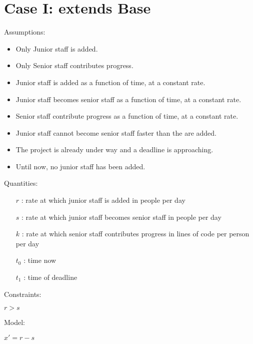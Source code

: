 \documentclass{article}
\newenvironment{atomize}
    {\begin{list} {} {
            \setlength\itemindent{0pt}
            \setlength\leftmargin{10pt}
            \setlength\labelwidth{0pt}
    }}
    {\end{list}}
\begin{document}
\section*{Case I: extends Base}
    \begin{atomize}
        \item Assumptions:
            \begin{itemize}
                \item Only Junior staff is added.
                \item Only Senior staff contributes progress.
								\item Junior staff is added as a function of time, at a constant
								rate.
								\item Junior staff becomes senior staff as a function of time,
								at a constant rate.
								\item Senior staff contribute progress as a function of time, at
								a constant rate.
                \item Junior staff cannot become senior staff faster than the
								are added.
								\item The project is already under way and a deadline is
								approaching.
								\item Until now, no junior staff has been added.
            \end{itemize}
        \item Quantities:
            \begin{itemize}
                \item [$r$]: rate at which junior staff is added in people per
								day
                \item [$s$]: rate at which junior staff becomes senior staff in
								people per day
                \item [$k$]: rate at which senior staff contributes progress in
								lines of code per person per day
								\item [$t_{0}$]: time now
								\item [$t_{1}$]: time of deadline
            \end{itemize}
				\item Constraints:
						\begin{atomize}
								\item $r > s$
						\end{atomize}
        \item Model:
            \begin{atomize}
                \item $x\prime = r - s$

\end{atomize}
\end{atomize}
\end{document}
